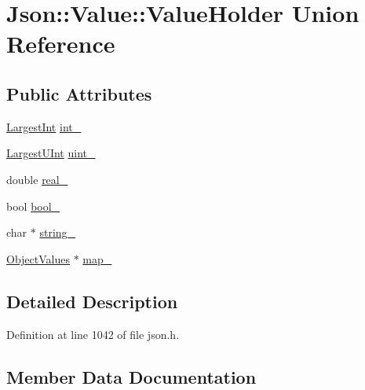 \hypertarget{union_json_1_1_value_1_1_value_holder}{}\section{Json\+:\+:Value\+:\+:Value\+Holder Union Reference}
\label{union_json_1_1_value_1_1_value_holder}
\subsection*{Public Attributes}
\begin{DoxyCompactItemize}
\item 
\hyperlink{class_json_1_1_value_a1cbb82642ed05109b9833e49f042ece7}{Largest\+Int} \hyperlink{union_json_1_1_value_1_1_value_holder_adbfb384301298844ed955ba5cf6015a0}{int\+\_\+}
\item 
\hyperlink{class_json_1_1_value_a6682a3684d635e03fc06ba229fa24eec}{Largest\+U\+Int} \hyperlink{union_json_1_1_value_1_1_value_holder_aab65665dc15a24a29a8e93cdeeaa7e50}{uint\+\_\+}
\item 
double \hyperlink{union_json_1_1_value_1_1_value_holder_af0c5ca724e5fe3a15db773d750e2351e}{real\+\_\+}
\item 
bool \hyperlink{union_json_1_1_value_1_1_value_holder_a92edab1861dadbfefd8be5fd4285eefe}{bool\+\_\+}
\item 
char $\ast$ \hyperlink{union_json_1_1_value_1_1_value_holder_afedf5861e3368a0a9587e499f1ac23b9}{string\+\_\+}
\item 
\hyperlink{class_json_1_1_value_a08b6c80c3af7071d908dabf044de5388}{Object\+Values} $\ast$ \hyperlink{union_json_1_1_value_1_1_value_holder_a37a6355da01e4dec1fabba8c1520f297}{map\+\_\+}
\end{DoxyCompactItemize}


\subsection{Detailed Description}


Definition at line 1042 of file json.\+h.



\subsection{Member Data Documentation}
\hypertarget{union_json_1_1_value_1_1_value_holder_a92edab1861dadbfefd8be5fd4285eefe}{}\label{union_json_1_1_value_1_1_value_holder_a92edab1861dadbfefd8be5fd4285eefe} 

